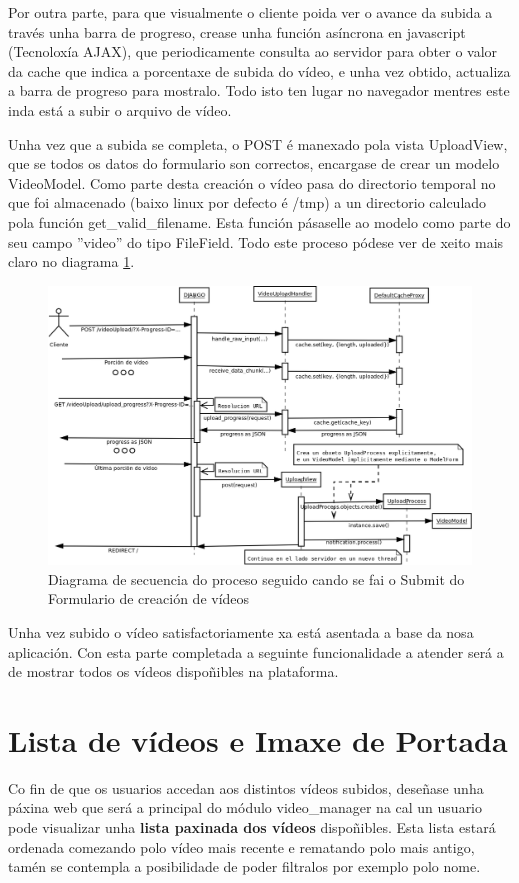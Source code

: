 	Por outra parte, para que visualmente o cliente poida ver o avance da subida a través unha
	barra de progreso, crease unha función asíncrona en javascript (Tecnoloxía AJAX), que 
	periodicamente consulta ao servidor para obter o valor da cache que indica a porcentaxe de
	subida do vídeo, e unha vez obtido, actualiza a barra de progreso para mostralo. Todo isto
	ten lugar no navegador mentres este inda está a subir o arquivo de vídeo.

	Unha vez que a subida se completa, o POST é manexado pola vista UploadView, que se todos
	os datos do formulario son correctos, encargase de crear un modelo VideoModel. Como parte
	desta creación o vídeo pasa do directorio temporal no que foi almacenado (baixo linux por 
	defecto é /tmp) a un directorio calculado pola función get\_valid\_filename. Esta función
	pásaselle ao modelo como parte do seu campo ''video'' do tipo FileField. Todo este proceso
	pódese ver de xeito mais claro no diagrama \ref{fig:SubidaVideo}.
	
	\begin{figure}[htp]
	\begin{center}
		\includegraphics[scale=0.3]{figures/SubidaVideo.png}
		\caption{Diagrama de secuencia do proceso seguido cando se fai o Submit do Formulario 
		de creación de vídeos}
	\label{fig:SubidaVideo}
	\end{center}
	\end{figure}
	
	Unha vez subido o vídeo satisfactoriamente xa está asentada a base da nosa aplicación. Con esta
	parte completada a seguinte funcionalidade a atender será a de mostrar todos os vídeos 
	dispoñibles na plataforma.

\section{Lista de vídeos e Imaxe de Portada}
    Co fin de que os usuarios accedan aos distintos vídeos subidos, deseñase unha páxina web que será a
    principal do módulo video\_manager na cal un usuario pode visualizar unha \textbf{ lista paxinada dos
    vídeos} dispoñibles. Esta lista estará ordenada comezando polo vídeo mais recente e rematando
    polo mais antigo, tamén se contempla a posibilidade de poder filtralos por exemplo polo nome.
    
